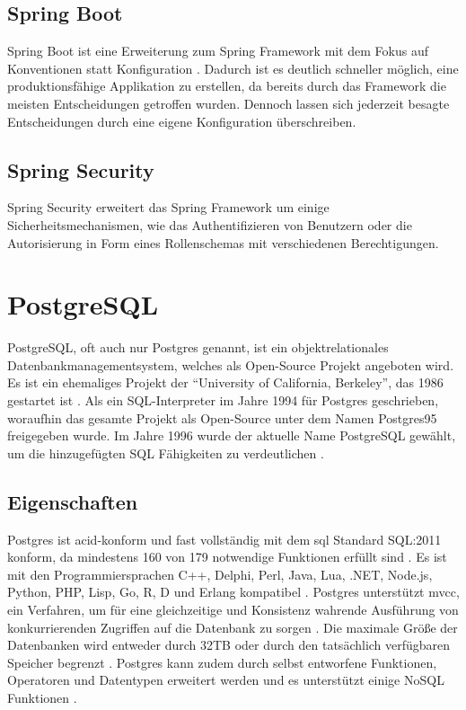 \subsection{Spring Boot} \label{spring-boot}
Spring Boot ist eine Erweiterung zum Spring Framework mit dem Fokus auf Konventionen statt Konfiguration \cite[S.~31]{spring-book-3}. Dadurch ist es deutlich schneller möglich, eine produktionsfähige Applikation zu erstellen, da bereits durch das Framework die meisten Entscheidungen getroffen wurden. Dennoch lassen sich jederzeit besagte Entscheidungen durch eine eigene Konfiguration überschreiben.

\subsection{Spring Security}
Spring Security erweitert das Spring Framework um einige Sicherheitsmechanismen, wie das Authentifizieren von Benutzern oder die Autorisierung in Form eines Rollenschemas mit verschiedenen Berechtigungen.

\clearpage

\section{PostgreSQL} \label{postgres}
PostgreSQL, oft auch nur Postgres genannt, ist ein objektrelationales Datenbankmanagementsystem, welches als Open-Source Projekt angeboten wird.
Es ist ein ehemaliges Projekt der \enquote{University of California, Berkeley}, das 1986 gestartet ist \cite{postgres-history}.
Als ein SQL-Interpreter im Jahre 1994 für Postgres geschrieben, woraufhin das gesamte Projekt als Open-Source unter dem Namen Postgres95 freigegeben wurde.
Im Jahre 1996 wurde der aktuelle Name PostgreSQL gewählt, um die hinzugefügten SQL Fähigkeiten zu verdeutlichen \cite{postgres-history}.

\subsection{Eigenschaften}
Postgres ist \gls{acid}-konform und fast vollständig mit dem \gls{sql} Standard SQL:2011 konform, da mindestens 160 von 179 notwendige Funktionen erfüllt sind \cite{postgres-about}.
Es ist mit den Programmiersprachen C++, Delphi, Perl, Java, Lua, .NET, Node.js, Python, PHP, Lisp, Go, R, D und Erlang kompatibel \cite{postgres-mysql-comparison}.
Postgres unterstützt \gls{mvcc}, ein Verfahren, um für eine gleichzeitige und Konsistenz wahrende Ausführung von konkurrierenden Zugriffen auf die Datenbank zu sorgen \cite{postgres-about}. Die maximale Größe der Datenbanken wird entweder durch 32TB oder durch den tatsächlich verfügbaren Speicher begrenzt \cite{postgres-about}. Postgres kann zudem durch selbst entworfene Funktionen, Operatoren und Datentypen erweitert werden und es unterstützt einige NoSQL Funktionen \cite{postgres-about}.

